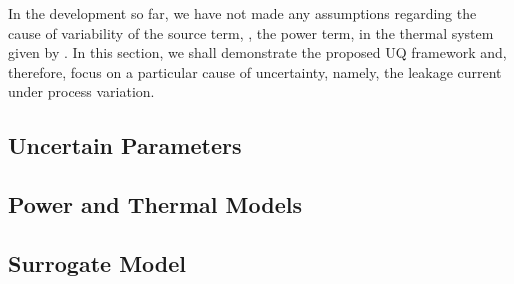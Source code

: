 In the development so far, we have not made any assumptions regarding the cause of variability of the source term, \ie, the power term, in the thermal system given by . In this section, we shall demonstrate the proposed UQ framework and, therefore, focus on a particular cause of uncertainty, namely, the leakage current under process variation.

\subsection{Uncertain Parameters} 


\subsection{Power and Thermal Models}  


\subsection{Surrogate Model} 

